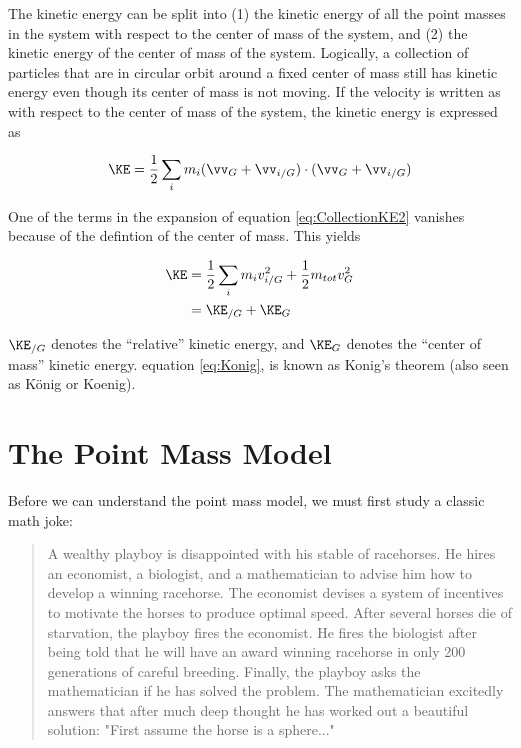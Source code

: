 The kinetic energy can be split into (1) the kinetic energy of all the point masses in the system with respect to the center of mass of the system, and (2) the kinetic energy of the center of mass of the system. Logically, a collection of particles that are in circular orbit around a fixed center of mass still has kinetic energy even though its center of mass is not moving. If the velocity is written as with respect to the center of mass of the system, the kinetic energy is expressed as

\begin{equation}
\KE = \frac{1}{2} \sum_{i} m_{i} (\vv_{G} + \vv_{i/G}) \cdot (\vv_{G} + \vv_{i/G})
\label{eq:CollectionKE2}
\end{equation}

One of the terms in the expansion of equation \ref{eq:CollectionKE2} vanishes because of the defintion of the center of mass. This yields

\begin{align}
\KE &= \frac{1}{2} \sum_{i} m_{i} v_{i/G}^2 + \frac{1}{2} m_{tot} v_{G}^2 \\
&= \KE_{/G} + \KE_{G}
\label{eq:Konig}
\end{align}

$\KE_{/G}$ denotes the ``relative'' kinetic energy, and $\KE_{G}$ denotes the ``center of mass'' kinetic energy. equation \ref{eq:Konig}, is known as Konig's theorem (also seen as K\"{o}nig or Koenig).

\section{The Point Mass Model} %
\label{sec:ThePointMassModel}

Before we can understand the point mass model, we must first study a classic math joke:

\begin{quote}

A wealthy playboy is disappointed with his stable of racehorses. He hires an economist, a biologist, and a mathematician to advise him how to develop a winning racehorse. The economist devises a system of incentives to motivate the horses to produce optimal speed. After several horses die of starvation, the playboy fires the economist. He fires the biologist after being told that he will have an award winning racehorse in only 200 generations of careful breeding. Finally, the playboy asks the mathematician if he has solved the problem. The mathematician excitedly answers that after much deep thought he has worked out a beautiful solution: "First assume the horse is a sphere..."

\end{quote}

